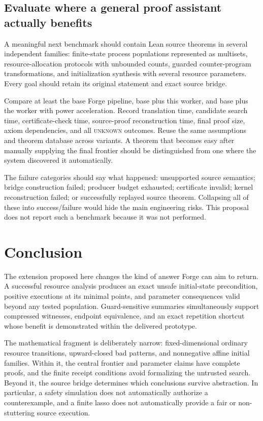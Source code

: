 \documentclass[11pt,a4paper]{article}
\newcommand{\unknown}{\textsc{unknown}}
\theoremstyle{definition}
\theoremstyle{remark}
\begin{document}
\subsection{Evaluate where a general proof assistant actually benefits}
A meaningful next benchmark should contain Lean source theorems in several independent families: finite-state process populations represented as multisets, resource-allocation protocols with unbounded counts, guarded counter-program transformations, and initialization synthesis with several resource parameters. Every goal should retain its original statement and exact source bridge.

Compare at least the base Forge pipeline, base plus this worker, and base plus the worker with power acceleration. Record translation time, candidate search time, certificate-check time, source-proof reconstruction time, final proof size, axiom dependencies, and all \unknown{} outcomes. Reuse the same assumptions and theorem database across variants. A theorem that becomes easy after manually supplying the final frontier should be distinguished from one where the system discovered it automatically.

The failure categories should say what happened: unsupported source semantics; bridge construction failed; producer budget exhausted; certificate invalid; kernel reconstruction failed; or successfully replayed source theorem. Collapsing all of these into success/failure would hide the main engineering risks. This proposal does not report such a benchmark because it was not performed.

\section{Conclusion}
The extension proposed here changes the kind of answer Forge can aim to return. A successful resource analysis produces an exact unsafe initial-state precondition, positive executions at its minimal points, and parameter consequences valid beyond any tested population. Guard-sensitive summaries simultaneously support compressed witnesses, endpoint equivalence, and an exact repetition shortcut whose benefit is demonstrated within the delivered prototype.

The mathematical fragment is deliberately narrow: fixed-dimensional ordinary resource transitions, upward-closed bad patterns, and nonnegative affine initial families. Within it, the central frontier and parameter claims have complete proofs, and the finite receipt conditions avoid formalizing the untrusted search. Beyond it, the source bridge determines which conclusions survive abstraction. In particular, a safety simulation does not automatically authorize a counterexample, and a finite lasso does not automatically provide a fair or non-stuttering source execution.
\end{document}
